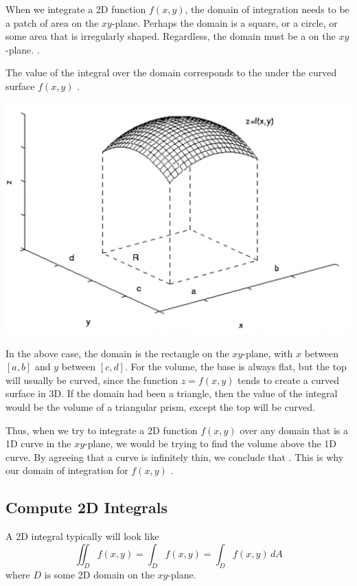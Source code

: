 When we integrate a 2D function $f(x, y)$, the domain of integration needs to be a patch of area on the $xy$-plane. Perhaps the domain is a square, or a circle, or some area that is irregularly shaped. Regardless, the domain must be a  on the $xy$-plane. .

The value of the integral over the domain corresponds to the  under the curved surface $f(x, y)$ .

\begin{center} \includegraphics[width=0.75\linewidth]{Plots/s_4_1/Integral.png} \end{center}

In the above case, the domain is the rectangle on the $xy$-plane, with $x$ between $[a, b]$ and $y$ between $[c, d]$. For the volume, the base is always flat, but the top will usually be curved, since the function $z = f(x, y)$ tends to create a curved surface in 3D. If the domain had been a triangle, then the value of the integral would be the volume of a triangular prism, except the top will be curved.

Thus, when we try to integrate a 2D function $f(x, y)$ over any domain that is a 1D curve in the $xy$-plane, we would be trying to find the volume above the 1D curve. By agreeing that a curve is infinitely thin, we conclude that . This is why our domain of integration for $f(x, y)$ .

\subsection*{Compute 2D Integrals}

A 2D integral typically will look like $$\iint_D f(x,y) = \int_D f(x, y) = \int_D f(x,y) \,dA$$ where $D$ is some 2D domain on the $xy$-plane.

